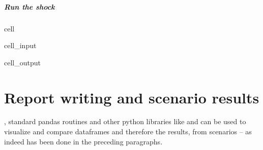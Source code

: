\documentclass[letterpaper,10pt,english]{jupyterBook}
\begin{document}
\paragraph{Run the shock}
\label{\detokenize{content/06_WBModels/ScenarioAnalysis:run-the-shock}}
\begin{sphinxuseclass}{cell}\begin{sphinxVerbatimInput}

\begin{sphinxuseclass}{cell_input}
\begin{sphinxVerbatim}[commandchars=\\\{\}]
  
\PYG{p}{[}\PYG{p}{]}
\end{sphinxVerbatim}

\end{sphinxuseclass}\end{sphinxVerbatimInput}
\begin{sphinxVerbatimOutput}

\begin{sphinxuseclass}{cell_output}
\noindent{}

\end{sphinxuseclass}\end{sphinxVerbatimOutput}

\end{sphinxuseclass}

\chapter{Report writing and scenario results}
\label{\detokenize{content/06_WBModels/ScenarioAnalysis:report-writing-and-scenario-results}}
\sphinxAtStartPar
{}, standard pandas routines and other python libraries like  and  can be used to visualize and compare dataframes and therefore the results, from scenarios – as indeed has been done in the preceding paragraphs.
\end{document}
